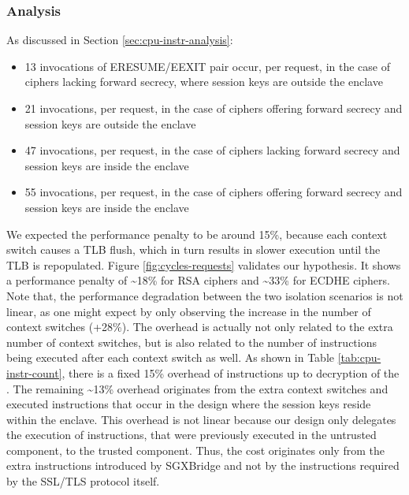 \documentclass[../../../main.tex]{subfiles}
\begin{document}
\subsubsection*{Analysis}
As discussed in Section \ref{sec:cpu-instr-analysis}:
\begin{itemize}
  \item 13 invocations of ERESUME/EEXIT pair occur, per request, in
    the case of ciphers lacking forward secrecy, where session keys are
    outside the enclave
  \item 21 invocations, per request, in the case of ciphers offering
    forward secrecy and session keys are outside the enclave
  \item 47 invocations, per request, in the case of ciphers lacking
    forward secrecy and session keys are inside the enclave
  \item 55 invocations, per request, in the case of ciphers offering
    forward secrecy and session keys are inside the enclave
\end{itemize}
We expected the performance penalty to be around 15\%, because each
context switch causes a TLB flush, which in turn results in slower
execution until the TLB is repopulated. Figure
\ref{fig:cycles-requests} validates our hypothesis. It shows a
performance penalty of \textasciitilde18\% for RSA ciphers and
\textasciitilde33\% for ECDHE ciphers. Note that, the performance
degradation between the two isolation scenarios is not linear, as one
might expect by only observing the increase in the number of context
switches (+28\%). The overhead is actually not only related
to the extra number of context switches, but is also related to the
number of instructions being executed after each context switch
as well. As shown in Table \ref{tab:cpu-instr-count}, there is
a fixed 15\% overhead of instructions up to decryption of the
\premaster. The remaining \textasciitilde13\% overhead originates
from the extra context switches and executed instructions that occur
in the design where the session keys reside within the enclave. This
overhead is not linear because our design only delegates the
execution of instructions, that were previously executed in the
untrusted component, to the trusted component. Thus, the cost
originates only from the extra instructions introduced by SGXBridge
and not by the instructions required by the SSL/TLS protocol itself.

\end{document}
